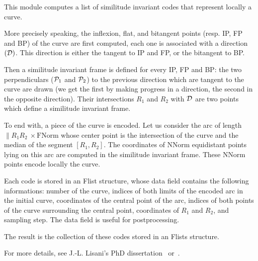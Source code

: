 This module computes a list of similitude invariant codes that represent locally a curve.

More precisely speaking, the inflexion, flat, and bitangent points (resp. IP, FP and BP) of the curve are first computed, each one is associated with a direction $({\cal D})$. This direction is either the tangent to IP and FP, or the bitangent to BP.

Then a similitude invariant frame is defined for every IP, FP and BP: the two perpendiculars (${\cal P}_1$ and ${\cal P}_2$) to the previous direction which are tangent to the curve are drawn (we get the first by making progress in a direction, the second in the opposite direction). Their intersections $R_1$ and $R_2$ with ${\cal D}$ are two points which define a similitude invariant frame.

To end with, a piece of the curve is encoded. Let us consider the arc of length $\| R_1R_2 \ \times \mbox{FNorm}$ whose center point is the intersection of the curve and the median of the segment $[R_1,R_2]$. The coordinates of $\mbox{NNorm}$ equidistant points lying on this arc are computed in the similitude invariant frame. These $\mbox{NNorm}$ points encode locally the curve.

\medskip

Each code is stored in an Flist structure, whose data field contains the following informations: number of the curve, indices of both limits of the encoded arc in the initial curve, coordinates of the central point of the arc, indices of both points of the curve surrounding the central point, coordinates of $R_1$ and $R_2$, and sampling step. The data field is useful for postprocessing.

The result is the collection of these codes stored in an Flists structure.

\medskip

For more details, see J.-L. Lisani's PhD dissertation~\cite{lisani:comparaison} 
or~\cite{lisani.monasse.ea:on}.